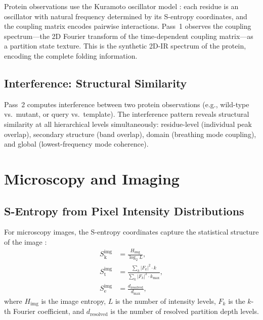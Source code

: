 \documentclass[11pt,twocolumn,a4paper]{article}
\theoremstyle{definition}
\theoremstyle{remark}
\newcommand{\Sk}{S_{\mathrm{k}}}
\newcommand{\St}{S_{\mathrm{t}}}
\newcommand{\Se}{S_{\mathrm{e}}}
\begin{document}
Protein observations use the Kuramoto oscillator model \citep{kuramoto1975, sachikonye2025_partition}: each residue is an oscillator with natural frequency determined by its S-entropy coordinates, and the coupling matrix encodes pairwise interactions. Pass~1 observes the coupling spectrum---the 2D Fourier transform of the time-dependent coupling matrix---as a partition state texture. This is the synthetic 2D-IR spectrum of the protein, encoding the complete folding information.

\subsection{Interference: Structural Similarity}

Pass~2 computes interference between two protein observations (e.g., wild-type vs.\ mutant, or query vs.\ template). The interference pattern reveals structural similarity at all hierarchical levels simultaneously: residue-level (individual peak overlap), secondary structure (band overlap), domain (breathing mode coupling), and global (lowest-frequency mode coherence).


\section{Microscopy and Imaging}
\label{sec:imaging}

\subsection{S-Entropy from Pixel Intensity Distributions}

For microscopy images, the S-entropy coordinates capture the statistical structure of the image \citep{sachikonye2025_partition}:
\begin{align}
\Sk^{\mathrm{img}} &= \frac{H_{\mathrm{img}}}{\log_2 L}, \label{eq:sk_img} \\
\St^{\mathrm{img}} &= \frac{\sum_k |F_k|^2 \cdot k}{\sum_k |F_k|^2 \cdot k_{\max}}, \label{eq:st_img} \\
\Se^{\mathrm{img}} &= \frac{d_{\mathrm{resolved}}}{d_{\max}}, \label{eq:se_img}
\end{align}
where $H_{\mathrm{img}}$ is the image entropy, $L$ is the number of intensity levels, $F_k$ is the $k$-th Fourier coefficient, and $d_{\mathrm{resolved}}$ is the number of resolved partition depth levels.
\end{document}

